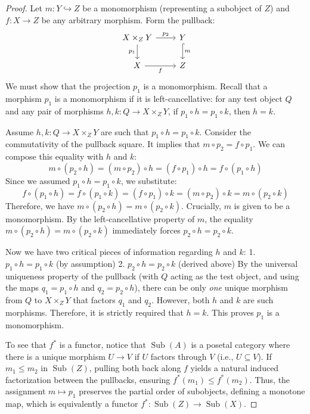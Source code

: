 \begin{proof}
Let $m: Y \hookrightarrow Z$ be a monomorphism (representing a subobject of $Z$) and $f: X \to Z$ be any arbitrary morphism. Form the pullback:
\begin{equation}
\label{eq:mono_pullback}
\begin{tikzcd}
X \times_Z Y \arrow[r, "p_2"] \arrow[d, "p_1"'] & Y \arrow[d, "m", hook] \\
X \arrow[r, "f"'] & Z
\end{tikzcd}
\end{equation}
We must show that the projection $p_1$ is a monomorphism. Recall that a morphism $p_1$ is a monomorphism if it is left-cancellative: for any test object $Q$ and any pair of morphisms $h, k: Q \to X \times_Z Y$, if $p_1 \circ h = p_1 \circ k$, then $h = k$.

Assume $h, k: Q \to X \times_Z Y$ are such that $p_1 \circ h = p_1 \circ k$.
Consider the commutativity of the pullback square. It implies that $m \circ p_2 = f \circ p_1$. We can compose this equality with $h$ and $k$:
\[
m \circ (p_2 \circ h) = (m \circ p_2) \circ h = (f \circ p_1) \circ h = f \circ (p_1 \circ h)
\]
Since we assumed $p_1 \circ h = p_1 \circ k$, we substitute:
\[
f \circ (p_1 \circ h) = f \circ (p_1 \circ k) = (f \circ p_1) \circ k = (m \circ p_2) \circ k = m \circ (p_2 \circ k)
\]
Therefore, we have $m \circ (p_2 \circ h) = m \circ (p_2 \circ k)$.
Crucially, $m$ is given to be a monomorphism. By the left-cancellative property of $m$, the equality $m \circ (p_2 \circ h) = m \circ (p_2 \circ k)$ immediately forces $p_2 \circ h = p_2 \circ k$.

Now we have two critical pieces of information regarding $h$ and $k$:
1. $p_1 \circ h = p_1 \circ k$ (by assumption)
2. $p_2 \circ h = p_2 \circ k$ (derived above)
By the universal uniqueness property of the pullback (with $Q$ acting as the test object, and using the maps $q_1 = p_1 \circ h$ and $q_2 = p_2 \circ h$), there can be only \emph{one} unique morphism from $Q$ to $X \times_Z Y$ that factors $q_1$ and $q_2$. However, both $h$ and $k$ are such morphisms. Therefore, it is strictly required that $h = k$.
This proves $p_1$ is a monomorphism.

To see that $f^*$ is a functor, notice that $\operatorname{Sub}(A)$ is a posetal category where there is a unique morphism $U \to V$ if $U$ factors through $V$ (i.e., $U \subseteq V$). If $m_1 \leq m_2$ in $\operatorname{Sub}(Z)$, pulling both back along $f$ yields a natural induced factorization between the pullbacks, ensuring $f^*(m_1) \leq f^*(m_2)$. Thus, the assignment $m \mapsto p_1$ preserves the partial order of subobjects, defining a monotone map, which is equivalently a functor $f^*: \operatorname{Sub}(Z) \to \operatorname{Sub}(X)$.
\end{proof}



